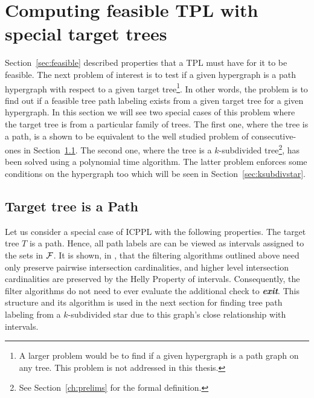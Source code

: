 \section[Special target trees]{ Computing feasible TPL with special target trees}
\label{sec:spltargettree}

Section~\ref{sec:feasible} described properties that a TPL must have
for it to be feasible. The next problem of interest is to test if a
given hypergraph is a path hypergraph with respect to a given target
tree\footnote{A larger problem would be to find if a given hypergraph
  is a path graph on any tree. This problem is not addressed in this
  thesis.}. In other words, the problem is to find out if a feasible
tree path labeling exists from a given target tree for a given
hypergraph. In this section we will see two special cases of this
problem where the target tree is from a particular family of
trees. The first one, where the tree is a path, is a shown to be
equivalent to the well studied problem of consecutive-ones in
Section~\ref{sec:icpplicpia}. The second one, where the tree is a
$k$-subdivided tree\footnote{See Section~\ref{ch:prelims} for the
  formal definition.}, has been solved using a polynomial time
algorithm. The latter problem enforces some conditions on the
hypergraph too which will be seen in Section~\ref{sec:ksubdivstar}.

\subsection{Target tree is a Path}
\label{sec:icpplicpia}

Let us consider a special case of ICPPL with the following properties.
The target tree $T$ is a path.  Hence, all path labels are can be viewed as
intervals assigned to the sets in ${\cal F}$.  It is shown, in
\cite{nsnrs09}, that the filtering algorithms outlined above need only
preserve pairwise intersection cardinalities, and higher level
intersection cardinalities are preserved by the Helly Property of
intervals.  Consequently, the filter algorithms do not need to ever
evaluate the additional check to {\em \bf exit}.
This structure and its algorithm is used in the next section for
finding tree path labeling from a $k$-subdivided star due to this
graph's close relationship with intervals.

